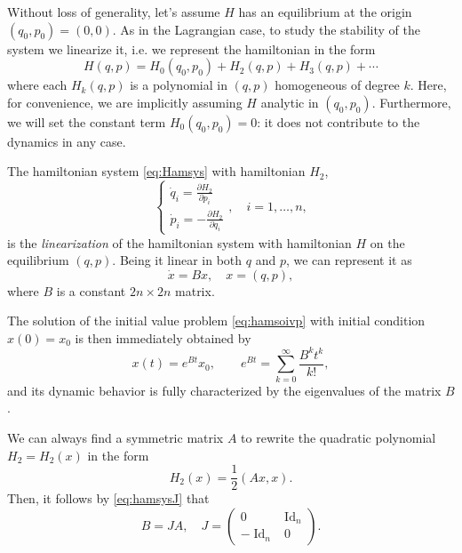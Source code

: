 \documentclass[english,fontsize=11pt,paper=a5,oneside]{scrbook}
\DeclareMathOperator{\Id}{Id}
\theoremstyle{definition}
\begin{document}
Without loss of generality, let's assume $H$ has an equilibrium at the origin $(q_0, p_0) = (0,0)$.
As in the Lagrangian case, to study the stability of the system we linearize it, i.e. we represent the hamiltonian in the form
\begin{equation}\label{eq:hamidevl}
    H(q,p) = H_0(q_0,p_0) + H_2(q,p) + H_3(q,p) + \cdots
\end{equation}
where each $H_k(q,p)$ is a polynomial in $(q,p)$ homogeneous of degree $k$.
Here, for convenience, we are implicitly assuming $H$ analytic in $(q_0,p_0)$.
Furthermore, we will set the constant term $H_0(q_0,p_0) = 0$: it does not contribute to the dynamics in any case.

The hamiltonian system \eqref{eq:Hamsys} with hamiltonian $H_2$,
\begin{equation}\label{eq:lienarizedH}
    \left\lbrace
    \begin{aligned}
        \dot q_i = \frac{\partial H_2}{\partial p_i} \\
        \dot p_i = -\frac{\partial H_2}{\partial q_i}
    \end{aligned}
    \right .,\quad i=1,\ldots,n,
\end{equation}
is the \emph{linearization} of the hamiltonian system with hamiltonian $H$ on the equilibrium $(q,p)$.
Being it linear in both $q$ and $p$, we can represent it as
\begin{equation}\label{eq:hamsoivp}
    \dot x = B x,\quad x =(q,p),
\end{equation}
where $B$ is a constant $2n\times2n$ matrix.

The solution of the initial value problem \eqref{eq:hamsoivp} with initial condition $x(0) = x_0$ is then immediately obtained by
\begin{equation}
    x(t) = e^{Bt} x_0, \qquad e^{Bt} = \sum_{k=0}^\infty \frac{B^k t^k}{k!},
\end{equation}
and its dynamic behavior is fully characterized by the eigenvalues of the matrix $B$.

We can always find a symmetric matrix $A$ to rewrite the quadratic polynomial $H_2 = H_2(x)$ in the form
\begin{equation}
    H_2(x) = \frac12 (Ax, x).
\end{equation}
Then, it follows by \eqref{eq:hamsysJ} that
\begin{equation}
    B = J A, \quad J = \begin{pmatrix}
        0&\Id_n\\-\Id_n&0
    \end{pmatrix}.
\end{equation}
\end{document}
